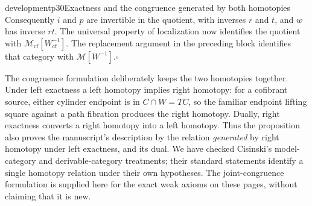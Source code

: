 \begin{dcomment}{development}{p30}{Exactness and the congruence generated by both homotopies}
Consequently $i$ and $p$ are invertible in the quotient, with inverses $r$ and $t$, and $w$ has inverse $rt$. The universal property of localization now identifies the quotient with $\mathcal M_{\mathrm{cf}}[W_{\mathrm{cf}}^{-1}]$. The replacement argument in the preceding block identifies that category with $\mathcal M[W^{-1}]$.\hfill$\square$

The congruence formulation deliberately keeps the two homotopies together. Under left exactness a left homotopy implies right homotopy: for a cofibrant source, either cylinder endpoint is in $C\cap W=TC$, so the familiar endpoint lifting square against a path fibration produces the right homotopy. Dually, right exactness converts a right homotopy into a left homotopy. Thus the proposition also proves the manuscript's description by the relation \emph{generated} by right homotopy under left exactness, and its dual. We have checked Cisinski's model-category and derivable-category treatments; their standard statements identify a single homotopy relation under their own hypotheses. The joint-congruence formulation is supplied here for the exact weak axioms on these pages, without claiming that it is new.
\end{dcomment}

